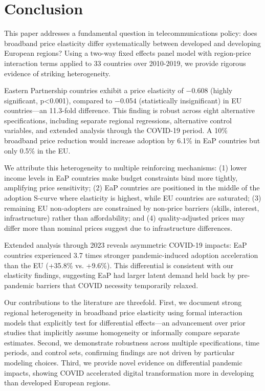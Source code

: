 \documentclass[12pt,review]{elsarticle}
\begin{document}
\section{Conclusion}
\label{sec:conclusion}

This paper addresses a fundamental question in telecommunications policy: does broadband price elasticity differ systematically between developed and developing European regions? Using a two-way fixed effects panel model with region-price interaction terms applied to 33 countries over 2010-2019, we provide rigorous evidence of striking heterogeneity.

Eastern Partnership countries exhibit a price elasticity of $-0.608$ (highly significant, p<0.001), compared to $-0.054$ (statistically insignificant) in EU countries—an 11.3-fold difference. This finding is robust across eight alternative specifications, including separate regional regressions, alternative control variables, and extended analysis through the COVID-19 period. A 10\% broadband price reduction would increase adoption by 6.1\% in EaP countries but only 0.5\% in the EU.

We attribute this heterogeneity to multiple reinforcing mechanisms: (1) lower income levels in EaP countries make budget constraints bind more tightly, amplifying price sensitivity; (2) EaP countries are positioned in the middle of the adoption S-curve where elasticity is highest, while EU countries are saturated; (3) remaining EU non-adopters are constrained by non-price barriers (skills, interest, infrastructure) rather than affordability; and (4) quality-adjusted prices may differ more than nominal prices suggest due to infrastructure differences.

Extended analysis through 2023 reveals asymmetric COVID-19 impacts: EaP countries experienced 3.7 times stronger pandemic-induced adoption acceleration than the EU (+35.8\% vs. +9.6\%). This differential is consistent with our elasticity findings, suggesting EaP had larger latent demand held back by pre-pandemic barriers that COVID necessity temporarily relaxed.

Our contributions to the literature are threefold. First, we document strong regional heterogeneity in broadband price elasticity using formal interaction models that explicitly test for differential effects—an advancement over prior studies that implicitly assume homogeneity or informally compare separate estimates. Second, we demonstrate robustness across multiple specifications, time periods, and control sets, confirming findings are not driven by particular modeling choices. Third, we provide novel evidence on differential pandemic impacts, showing COVID accelerated digital transformation more in developing than developed European regions.
\end{document}
